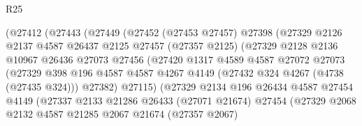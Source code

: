 \begin{lexlean}{R25}
\begin{coremodule}
                        (@27412
                          (@27443
                            (@27449
                              (@27452
                                (@27453 @27457)
                                @27398
                                (@27329
                                  @2126
                                  @2137
                                  @4587
                                  @26437
                                  @2125
                                  @27457
                                  (@27357 @2125)
                                  (@27329
                                    @2128
                                    @2136
                                    @10967
                                    @26436
                                    @27073
                                    @27456
                                    (@27420
                                      @1317
                                      @4589
                                      @4587
                                      @27072
                                      @27073
                                      (@27329
                                        @398
                                        @196
                                        @4587
                                        @4587
                                        @4267
                                        @4149
                                        (@27432 @324 @4267 (@4738 (@27435 @324)))
                                        @27382)
                                      @27115)
                                    (@27329
                                      @2134
                                      @196
                                      @26434
                                      @4587
                                      @27454
                                      @4149
                                      (@27337
                                        @2133
                                        @21286
                                        @26433
                                        (@27071 @21674)
                                        @27454
                                        (@27329
                                          @2068
                                          @2132
                                          @4587
                                          @21285
                                          @2067
                                          @21674
                                          (@27357 @2067)

\end{coremodule}
\end{lexlean}
